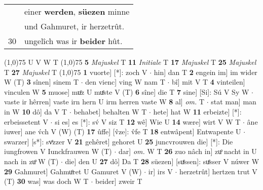 \documentclass[8pt,a4paper,notitlepage]{article}
\begin{document}
\begin{table}[ht]
\begin{minipage}[t]{0.5\linewidth}
\begin{tabular}{rl}
 & einer \textbf{werden}, \textbf{süezen} minne\\ 
 & und Gahmuret, ir herzetrût.\\ 
30 & ungelîch was ir \textbf{beider} hût.\\ 
\end{tabular}
\scriptsize
\line(1,0){75} \newline
U V W T \newline
\line(1,0){75} \newline
\textbf{5} \textit{Majuskel} T  \textbf{11} \textit{Initiale} T  \textbf{17} \textit{Majuskel} T  \textbf{25} \textit{Majuskel} T  \textbf{27} \textit{Majuskel} T  \newline
\line(1,0){75} \newline
\textbf{1} vuorte] [*]: zoch V  $\cdot$ hin] dan T \textbf{2} engein im] im wider W (T) \textbf{3} sînen] sinem T  $\cdot$ den vienc] ving W nam T  $\cdot$ bî] mit V T \textbf{4} vinteilen] vinculen W \textbf{5} muose] muͦz U muͤste V (T) \textbf{6} sîne] die T \textbf{7} sine] [Si]: Sú V Sy W  $\cdot$ vaste ir hêrren] vaste irn hern U irm herren vaste W \textbf{8} al] \textit{om.} T  $\cdot$ stat man] man in W \textbf{10} dô] da V T  $\cdot$ behabet] behalten W T  $\cdot$ hete] hat W \textbf{11} erbeizte] [*]: erbeissetent V  $\cdot$ si es] es [*]: sv́ V siz T \textbf{12} wê] Wie U \textbf{14} wære] wirt V W T  $\cdot$ âne iuwer] ane v́ch V (W) (T) \textbf{17} ûffe] [v̂ze]: v̂fe T \textbf{18} entwâpent] Entwapente U  $\cdot$ swarzer] [s*]: svͤzzer V \textbf{21} gehêret] gehoret U \textbf{25} juncvrouwen die] [*]: Die iungfrowen V Iunckfrauwen W (T)  $\cdot$ dar] \textit{om.} W T \textbf{26} zuo nâch in] zuͦ nacht in U nach in zuͦ W (T)  $\cdot$ die] den U \textbf{27} dô] Da T \textbf{28} süezen] [suͤssen]: suͤsser V núwer W \textbf{29} Gahmuret] Gahmuͦret U Gamuret V (W)  $\cdot$ ir] irs V  $\cdot$ herzetrût] hertzen trut V (T) \textbf{30} was] was doch W T  $\cdot$ beider] zweir T \newline
\end{minipage}
\end{table}
\end{document}
